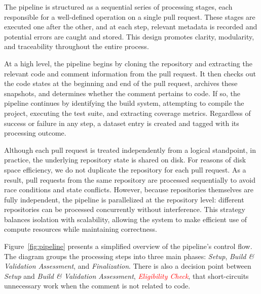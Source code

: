 The pipeline is structured as a sequential series of processing stages, each responsible for a
well-defined operation on a single pull request. These stages are executed one after the other, and
at each step, relevant metadata is recorded and potential errors are caught and stored. This design
promotes clarity, modularity, and traceability throughout the entire process.

At a high level, the pipeline begins by cloning the repository and extracting the relevant code and
comment information from the pull request. It then checks out the code states at the beginning and
end of the pull request, archives these snapshots, and determines whether the comment pertains to
code. If so, the pipeline continues by identifying the build system, attempting to compile the
project, executing the test suite, and extracting coverage metrics. Regardless of success or failure
in any step, a dataset entry is created and tagged with its processing outcome.

Although each pull request is treated independently from a logical standpoint, in practice, the
underlying repository state is shared on disk. For reasons of disk space efficiency, we do not
duplicate the repository for each pull request. As a result, pull requests from the same repository
are processed sequentially to avoid race conditions and state conflicts. However, because
repositories themselves are fully independent, the pipeline is parallelized at the repository level:
different repositories can be processed concurrently without interference. This strategy balances
isolation with scalability, allowing the system to make efficient use of compute resources while
maintaining correctness.

Figure~\ref{fig:pipeline} presents a simplified overview of the pipeline’s control flow. The diagram
groups the processing steps into three main phases: \textit{Setup}, \textit{Build \& Validation
	Assessment}, and \textit{Finalization}. There is also a decision point between \textit{Setup} and
\textit{Build \& Validation Assessment}, \textcolor{red}{\textit{Eligibility Check}}, that short-circuits unnecessary work when the comment is not
related to code.

